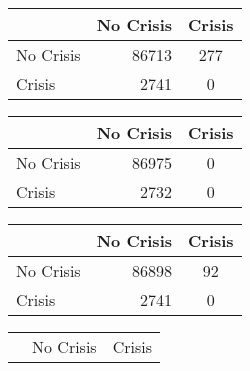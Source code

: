 \begin{table}
    \begin{center}
        \begin{subtable}[c]{0.4\textwidth}
            \begin{tabular}{lrc}
                \hline
                 & No Crisis & Crisis \\
                \hline
                No Crisis & 86713 & 277 \\
                Crisis & 2741 & 0\\
                \hline
            \end{tabular}
            \label{tab:mat-conf-raw-1.11}
        \end{subtable}
        \hspace{1em}\vspace{1em}
        \begin{subtable}[c]{0.4\textwidth}
                \begin{tabular}{lrc}
                \hline
                 & No Crisis & Crisis \\
                \hline
                No Crisis & 86975 & 0 \\
                Crisis & 2732 & 0\\
                \hline
            \end{tabular}
            \label{tab:mat-conf-stats-1.12}
        \end{subtable}
        \begin{subtable}[c]{0.4\textwidth}
            \begin{tabular}{lrc}
                \hline
                 & No Crisis & Crisis \\
                \hline
                No Crisis & 86898 & 92 \\
                Crisis & 2741 & 0\\
                \hline
            \end{tabular}
            \label{tab:mat-conf-raw-1.12}
        \end{subtable}
        \hspace{1em}\vspace{1em}
        \begin{subtable}[c]{0.4\textwidth}
                \begin{tabular}{lrc}
                \hline
                 & No Crisis & Crisis \\

\end{tabular}
\end{subtable}
\end{center}
\end{table}
